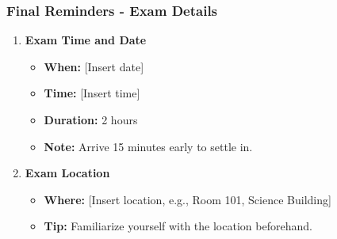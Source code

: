 \documentclass[aspectratio=169]{beamer}
\begin{document}
\begin{frame}[fragile]
    \frametitle{Final Reminders - Exam Details}
    \begin{enumerate}
        \item \textbf{Exam Time and Date}
            \begin{itemize}
                \item \textbf{When:} [Insert date]
                \item \textbf{Time:} [Insert time]
                \item \textbf{Duration:} 2 hours
                \item \textbf{Note:} Arrive 15 minutes early to settle in.
            \end{itemize}
        
        \item \textbf{Exam Location}
            \begin{itemize}
                \item \textbf{Where:} [Insert location, e.g., Room 101, Science Building]
                \item \textbf{Tip:} Familiarize yourself with the location beforehand.
            \end{itemize}
    \end{enumerate}
\end{frame}
\end{document}
